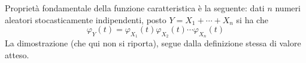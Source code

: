 \documentclass{subfiles}
\begin{document}
Proprietà fondamentale della funzione caratteristica è la seguente: dati \(n\) numeri aleatori  stocasticamente indipendenti,
posto \(Y = X_{1} + \cdots + X_{n}\) si ha che
\[
    \varphi_{Y}(t) = \varphi_{X_{1}}(t) \varphi_{X_{2}}(t) \cdots \varphi_{X_{n}}(t)
\]
La dimostrazione (che qui non si riporta), segue dalla definizione stessa di valore atteso.
\end{document}

